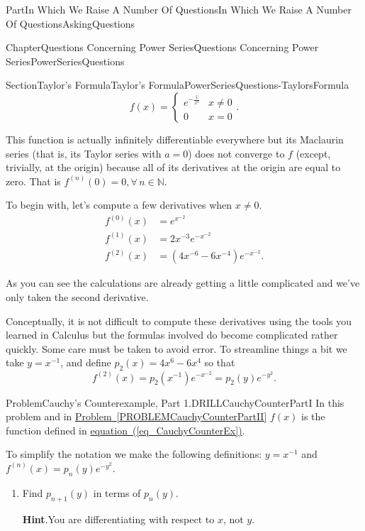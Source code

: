 \documentclass[oneside,10pt,]{book}
\newcommand{\blocktitlefont}{\relax}
\newcommand{\xreffont}{\relax}
\numberwithin{equation}{part}
\newcommand{\NN}{\mathbb {N}}
\newcommand{\amp}{&}
\begin{document}
\begin{partptx}{Part}{In Which We Raise A Number Of Questions}{}{In Which We Raise A Number Of Questions}{}{}{AskingQuestions}
\begin{chapterptx}{Chapter}{Questions Concerning Power Series}{}{Questions Concerning Power Series}{}{}{PowerSeriesQuestions}
\begin{sectionptx}{Section}{Taylor's Formula}{}{Taylor's Formula}{}{}{PowerSeriesQuestions-TaylorsFormula}
\begin{equation}
f(x) = \begin{cases} e^{-\frac{1}{x^2}}\amp  x\ne0\\ 0 \amp x=0 \end{cases}\text{.}\label{eq_CauchyCounterEx}
\end{equation}
%
\par
This function is actually infinitely differentiable everywhere but its Maclaurin series (that is, its Taylor series with \(a=0\)) does not converge to \(f\) (except, trivially, at the origin) because all of its derivatives at the origin are equal to zero. That is \(f^{(n)}(0) = 0, \forall\, n \in
\NN\).%
\par
To begin with, let's compute a few derivatives when \(x
\neq 0\).%
\begin{align*}
f^{(0)}(x) \amp = e^{x^{-2}}\\
f^{(1)}(x) \amp = 2x^{-3}e^{-x^{-2}}\\
f^{(2)}(x) \amp = \left(4x^{-6}-6x^{-4}\right)e^{-x^{-2}}\text{.}
\end{align*}
%
\par
As you can see the calculations are already getting a little complicated and we've only taken the second derivative.%
\par
Conceptually, it is not difficult to compute these derivatives using the tools you learned in Calculus but the formulas involved do become complicated rather quickly.  Some care must be taken to avoid error. To streamline things a bit we take \(y= x^{-1}\), and define \(p_2(x) = 4x^6-6x^4\) so that%
\begin{equation*}
f^{(2)}(x) = p_2(x^{-1})e^{-x^{-2}} = p_2(y)e^{-y^2}\text{.}
\end{equation*}
%
\begin{problem}{Problem}{Cauchy's Counterexample, Part 1.}{DRILLCauchyCounterPartI}%
In this problem and in \hyperref[PROBLEMCauchyCounterPartII]{Problem~{\xreffont\ref{PROBLEMCauchyCounterPartII}}} \(f(x)\) is the function defined in \hyperref[eq_CauchyCounterEx]{equation~({\xreffont\ref{eq_CauchyCounterEx}})}.%
 \par
To simplify the notation we make the following definitions: \(y=x^{-1}\) and \(f^{(n)}(x) =p_n(y)e^{-y^2}\).%
\begin{enumerate}[font=\bfseries,label=(\alph*),ref=\alph*]%
\item{}Find \(p_{n+1}(y)\) in terms of \(p_{n}(y)\).%
\par\smallskip%
\noindent\textbf{\blocktitlefont Hint}.\hypertarget{DRILLCauchyCounterPartI-4-2}{}\quad{}You are differentiating with respect to \(x\), not \(y\).%

\end{enumerate}
\end{problem}
\end{sectionptx}
\end{chapterptx}
\end{partptx}
\end{document}
